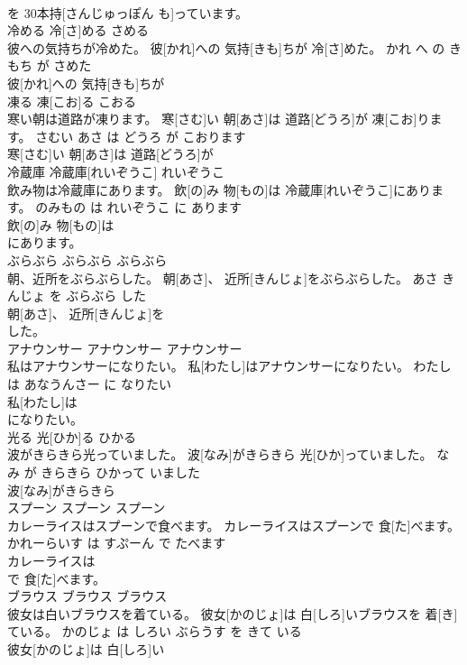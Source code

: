 \documentclass[8pt]{extreport}
\begin{document}
\begin{CJK}{UTF8}{min}
\\	を 30本持[さんじゅっぽん も]っています。			
\\	冷める	冷[さ]める	さめる	
\\	彼への気持ちが冷めた。	彼[かれ]への 気持[きも]ちが 冷[さ]めた。	かれ へ の きもち が さめた	
\\	彼[かれ]への 気持[きも]ちが
\\	凍る	凍[こお]る	こおる	
\\	寒い朝は道路が凍ります。	寒[さむ]い 朝[あさ]は 道路[どうろ]が 凍[こお]ります。	さむい あさ は どうろ が こおります	
\\	寒[さむ]い 朝[あさ]は 道路[どうろ]が
\\	冷蔵庫	冷蔵庫[れいぞうこ]	れいぞうこ	
\\	飲み物は冷蔵庫にあります。	飲[の]み 物[もの]は 冷蔵庫[れいぞうこ]にあります。	のみもの は れいぞうこ に あります	
\\	飲[の]み 物[もの]は
\\	にあります。			
\\	ぶらぶら	ぶらぶら	ぶらぶら	
\\	朝、近所をぶらぶらした。	朝[あさ]、 近所[きんじょ]をぶらぶらした。	あさ きんじょ を ぶらぶら した	
\\	朝[あさ]、 近所[きんじょ]を
\\	した。			
\\	アナウンサー	アナウンサー	アナウンサー	
\\	私はアナウンサーになりたい。	私[わたし]はアナウンサーになりたい。	わたし は あなうんさー に なりたい	
\\	私[わたし]は
\\	になりたい。			
\\	光る	光[ひか]る	ひかる	
\\	波がきらきら光っていました。	波[なみ]がきらきら 光[ひか]っていました。	なみ が きらきら ひかって いました	
\\	波[なみ]がきらきら
\\	スプーン	スプーン	スプーン	
\\	カレーライスはスプーンで食べます。	カレーライスはスプーンで 食[た]べます。	かれーらいす は すぷーん で たべます	
\\	カレーライスは
\\	で 食[た]べます。			
\\	ブラウス	ブラウス	ブラウス	
\\	彼女は白いブラウスを着ている。	彼女[かのじょ]は 白[しろ]いブラウスを 着[き]ている。	かのじょ は しろい ぶらうす を きて いる	
\\	彼女[かのじょ]は 白[しろ]い

\end{CJK}
\end{document}
